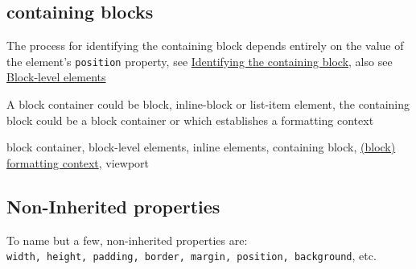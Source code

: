 \documentclass[a4paper, 12pt]{article}
\begin{document}
\subsection{containing blocks}
The process for identifying the containing block depends entirely on the value of the element's \verb|position| property, see \href{https://developer.mozilla.org/en-US/docs/Web/CSS/Containing_block#Identifying_the_containing_block}{Identifying the containing block}, also see \href{https://developer.mozilla.org/en-US/docs/Web/HTML/Block-level_elements}{Block-level elements}

A block container could be block, inline-block or list-item element, the containing block could be a block container or which establishes a formatting context

block container, block-level elements, inline elements, containing block, \href{https://developer.mozilla.org/en-US/docs/Web/Guide/CSS/Block_formatting_context}{(block) formatting context}, viewport

\subsection{Non-Inherited properties}
To name but a few, non-inherited properties are:\\ \verb|width, height, padding, border, margin, position, background|, etc.
\end{document}
